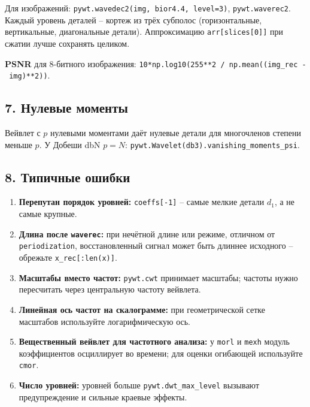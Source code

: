 \documentclass[12pt,a4paper,openany]{book}
\providecommand{\tightlist}{\setlength{\itemsep}{0pt}\setlength{\parskip}{0pt}}
\begin{document}
Для изображений: \texttt{pywt.\allowbreak{}wavedec2(\allowbreak{}img,\allowbreak{}\ \textquotesingle{}\allowbreak{}bior4.\allowbreak{}4\textquotesingle{}\allowbreak{},\allowbreak{}\ level=\allowbreak{}3)}, \texttt{pywt.\allowbreak{}waverec2}. Каждый уровень деталей -- кортеж из трёх субполос (горизонтальные, вертикальные, диагональные детали). Аппроксимацию \texttt{arr{[}slices{[}0{]}{]}} при сжатии лучше сохранять целиком.

\textbf{PSNR} для 8-битного изображения: \texttt{10*np.\allowbreak{}log10(\allowbreak{}255**2\ /\allowbreak{}\ np.\allowbreak{}mean(\allowbreak{}(\allowbreak{}img\_\allowbreak{}rec\ -\ img)**2))}.

\subsection*{7. Нулевые моменты}

Вейвлет с \(p\) нулевыми моментами даёт нулевые детали для многочленов степени меньше \(p\). У Добеши dbN \(p = N\): \texttt{pywt.\allowbreak{}Wavelet(\allowbreak{}\textquotesingle{}\allowbreak{}db3\textquotesingle{}\allowbreak{}).\allowbreak{}vanishing\_\allowbreak{}moments\_\allowbreak{}psi}.

\subsection*{8. Типичные ошибки}

\begin{enumerate}
\def\labelenumi{\arabic{enumi}.}
\tightlist
\item
  \textbf{Перепутан порядок уровней:} \texttt{coeffs{[}-1{]}} -- самые мелкие детали \(d_1\), а не самые крупные.
\item
  \textbf{Длина после \texttt{waverec}:} при нечётной длине или режиме, отличном от \texttt{\textquotesingle{}\allowbreak{}periodization\textquotesingle{}\allowbreak{}}, восстановленный сигнал может быть длиннее исходного -- обрежьте \texttt{x\_\allowbreak{}rec{[}:\allowbreak{}len(\allowbreak{}x){]}}.
\item
  \textbf{Масштабы вместо частот:} \texttt{pywt.\allowbreak{}cwt} принимает масштабы; частоты нужно пересчитать через центральную частоту вейвлета.
\item
  \textbf{Линейная ось частот на скалограмме:} при геометрической сетке масштабов используйте логарифмическую ось.
\item
  \textbf{Вещественный вейвлет для частотного анализа:} у \texttt{\textquotesingle{}\allowbreak{}morl\textquotesingle{}\allowbreak{}} и \texttt{\textquotesingle{}\allowbreak{}mexh\textquotesingle{}\allowbreak{}} модуль коэффициентов осциллирует во времени; для оценки огибающей используйте \texttt{\textquotesingle{}\allowbreak{}cmor\textquotesingle{}\allowbreak{}}.
\item
  \textbf{Число уровней:} уровней больше \texttt{pywt.\allowbreak{}dwt\_\allowbreak{}max\_\allowbreak{}level} вызывают предупреждение и сильные краевые эффекты.
\end{enumerate}
\end{document}
